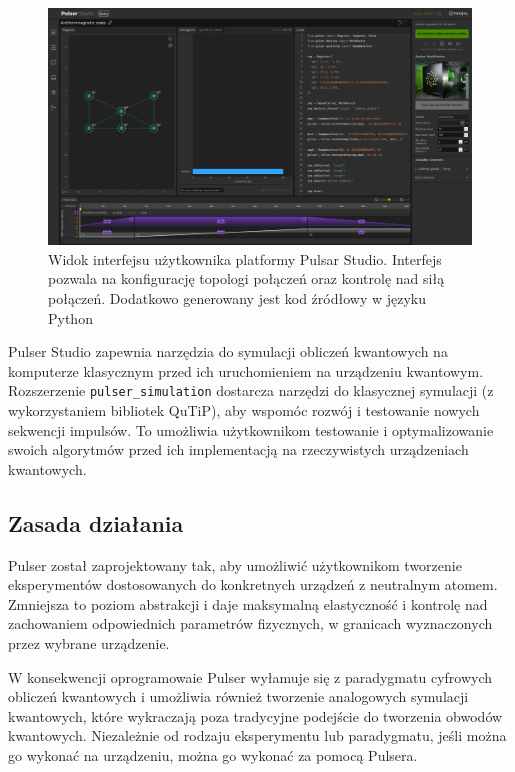 \documentclass[a4paper,12pt
]{article}
\begin{document}
\begin{figure}
\centering
\includegraphics{Pulser-Studio-basic-view.png}
\caption{Widok interfejsu użytkownika platformy Pulsar Studio. Interfejs pozwala na konfigurację topologi połączeń oraz kontrolę nad siłą połączeń. Dodatkowo generowany jest kod źródłowy w języku Python}
\end{figure}

Pulser Studio zapewnia narzędzia do symulacji obliczeń kwantowych na
komputerze klasycznym przed ich uruchomieniem na urządzeniu kwantowym.
Rozszerzenie \texttt{pulser\_simulation} dostarcza narzędzi do
klasycznej symulacji (z wykorzystaniem bibliotek QuTiP), aby wspomóc
rozwój i testowanie nowych sekwencji impulsów. To umożliwia użytkownikom
testowanie i optymalizowanie swoich algorytmów przed ich implementacją
na rzeczywistych urządzeniach kwantowych.

\hypertarget{zasada-dziaux142ania}{%
\subsection{Zasada działania}\label{zasada-dziaux142ania}}

Pulser został zaprojektowany tak, aby umożliwić użytkownikom tworzenie
eksperymentów dostosowanych do konkretnych urządzeń z neutralnym atomem.
Zmniejsza to poziom abstrakcji i daje maksymalną elastyczność i kontrolę
nad zachowaniem odpowiednich parametrów fizycznych, w granicach
wyznaczonych przez wybrane urządzenie.

W konsekwencji oprogramowaie Pulser wyłamuje się z paradygmatu cyfrowych
obliczeń kwantowych i umożliwia również tworzenie analogowych symulacji
kwantowych, które wykraczają poza tradycyjne podejście do tworzenia
obwodów kwantowych. Niezależnie od rodzaju eksperymentu lub paradygmatu,
jeśli można go wykonać na urządzeniu, można go wykonać za pomocą
Pulsera.
\end{document}
